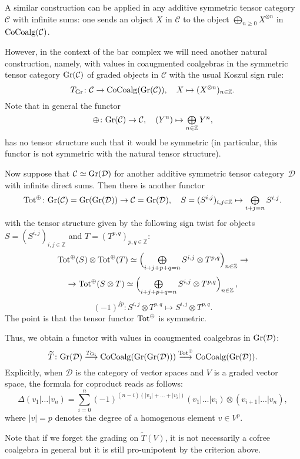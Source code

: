 \documentclass[10pt,russian]{article}
\theoremstyle{plain}
\theoremstyle{definition}
\newcommand{\Z}{\mathbb{Z}}
\newcommand{\Cc}{\mathcal{C}}
\newcommand{\Dc}{\mathcal{D}}
\newcommand{\CoCoalg}{{\rm CoCoalg}}
\newcommand{\Tot}{{\rm Tot}}
\newcommand{\Gr}{{\rm Gr}}
\begin{document}
\medskip

A similar construction can be applied in any additive symmetric tensor category $\Cc$ with infinite sums: one sends an object $X$ in $\Cc$ to the object $\bigoplus_{n\geqslant 0}X^{\otimes n}$ in $\CoCoalg(\Cc)$.

However, in the context of the bar complex we will need another natural construction, namely, with values in coaugmented coalgebras in the symmetric tensor category $\Gr(\Cc)$ of graded objects in $\Cc$ with the usual Koszul sign rule:
$$
T_{\Gr}\colon \Cc\to \CoCoalg(\Gr(\Cc)),\quad X\mapsto (X^{\otimes n})_{n\in \Z}.
$$
Note that in general the functor
$$
\oplus\colon \Gr(\Cc)\to \Cc,\quad(Y^n)\mapsto\mbox{$\bigoplus\limits_{n\in \Z}Y^n$},
$$
has no tensor structure such that it would be symmetric (in particular, this functor is not symmetric with the natural tensor structure).

Now suppose that $\Cc\simeq \Gr(\Dc)$ for another additive symmetric tensor category~$\Dc$ with infinite direct sums. Then there is another functor
$$
\Tot^{\oplus}\colon \Gr(\Cc)=\Gr(\Gr(\Dc))\to \Cc=\Gr(\Dc),\quad S=(S^{i,j})_{i,j\in\Z}\mapsto\mbox{$\bigoplus\limits_{i+j=n}S^{i,j}$}.
$$
with the tensor structure given by the following sign twist for objects $S=(S^{i,j})_{i,j\in\Z}$ and $T=(T^{p,q})_{p,q\in\Z}$:
$$
\Tot^{\oplus}(S)\otimes \Tot^{\oplus}(T)\simeq \Big(\mbox{$\bigoplus\limits_{i+j+p+q=n}S^{i,j}\otimes T^{p,q}$}\Big)_{n\in\Z}\to
$$
$$
\to\Tot^{\oplus}(S\otimes T)\simeq\Big(\mbox{$\bigoplus\limits_{i+j+p+q=n}S^{i,j}\otimes T^{p,q}$}\Big)_{n\in\Z}\,,
$$
$$
(-1)^{jp}\colon S^{i,j}\otimes T^{p,q}\mapsto S^{i,j}\otimes T^{p,q}.
$$
The point is that the tensor functor $\Tot^{\oplus}$ is symmetric. 

Thus, we obtain a functor with values in coaugmented coalgebras in $\Gr(\Dc)$:
\begin{equation}\label{eq:tildeT}
\widetilde{T}\colon\Gr(\Dc)\stackrel{T_{\Gr}}\longrightarrow \CoCoalg(\Gr(\Gr(\Dc)))\stackrel{\Tot^{\oplus}}\longrightarrow \CoCoalg(\Gr(\Dc)).
\end{equation}
Explicitly, when $\Dc$ is the category of vector spaces and $V$ is a graded vector space, the formula for coproduct reads as follows:
$$
\Delta(v_1|\ldots|v_n)=\sum_{i=0}^n(-1)^{(n-i)(|v_1|+\ldots+|v_{i}|)}(v_1|\ldots|v_i)\otimes (v_{i+1}|\ldots|v_{n}),
$$
where $|v|=p$ denotes the degree of a homogenous element $v\in V^p$.

Note that if we forget the grading on $\widetilde{T}(V)$, it is not necessarily a cofree coalgebra in general but it is still pro-unipotent by the criterion above.
\end{document}
